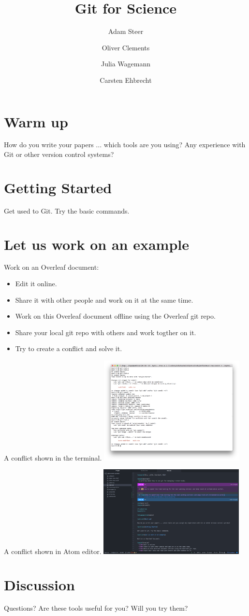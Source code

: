 \documentclass[fleqn,10pt]{wlscirep}
\title{Git for Science}
\author[1,*]{Adam Steer}
\author[2]{Oliver Clements}
\author[2]{Julia Wagemann}
\author[3]{Carsten Ehbrecht}
\affil[1]{NCI, Australia}
\affil[2]{PML, UK}
\affil[3]{DKRZ, Germany}
\begin{document}
\flushbottom
\maketitle

\thispagestyle{empty}

\section*{Warm up}

How do you write your papers ... which tools are you using? Any experience with Git or other version control systems?

\section*{Getting Started}

Get used to Git. Try the basic commands.

\section*{Let us work on an example}

Work on an Overleaf document:

\begin{itemize}
  \item Edit it online.
  \item Share it with other people and work on it at the same time.
  \item Work on this Overleaf document offline using the Overleaf git repo.
  \item Share your local git repo with others and work togther on it.
  \item Try to create a conflict and solve it.
\end{itemize}

A conflict shown in the terminal.
\includegraphics[width=20em]{terminal-conflict}

A conflict shown in Atom editor.
\includegraphics[width=20em]{atom-conflict}

\section*{Discussion}

Questions? Are these tools useful for you? Will you try them?
\end{document}
